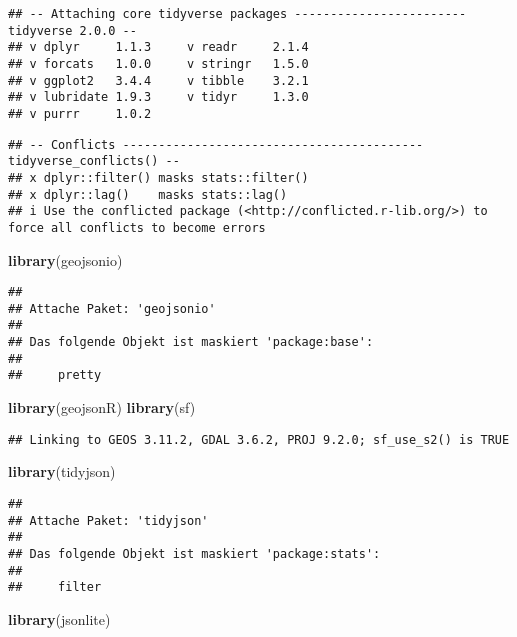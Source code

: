 \documentclass[
]{article}
\newenvironment{Shaded}{\begin{snugshade}}{\end{snugshade}}
\newcommand{\FunctionTok}[1]{\textcolor[rgb]{0.13,0.29,0.53}{\textbf{#1}}}
\newcommand{\NormalTok}[1]{#1}
\begin{document}
\begin{verbatim}
## -- Attaching core tidyverse packages ------------------------ tidyverse 2.0.0 --
## v dplyr     1.1.3     v readr     2.1.4
## v forcats   1.0.0     v stringr   1.5.0
## v ggplot2   3.4.4     v tibble    3.2.1
## v lubridate 1.9.3     v tidyr     1.3.0
## v purrr     1.0.2
\end{verbatim}

\begin{verbatim}
## -- Conflicts ------------------------------------------ tidyverse_conflicts() --
## x dplyr::filter() masks stats::filter()
## x dplyr::lag()    masks stats::lag()
## i Use the conflicted package (<http://conflicted.r-lib.org/>) to force all conflicts to become errors
\end{verbatim}

\begin{Shaded}
\begin{Highlighting}[]
\FunctionTok{library}\NormalTok{(geojsonio)}
\end{Highlighting}
\end{Shaded}

\begin{verbatim}
## 
## Attache Paket: 'geojsonio'
## 
## Das folgende Objekt ist maskiert 'package:base':
## 
##     pretty
\end{verbatim}

\begin{Shaded}
\begin{Highlighting}[]
\FunctionTok{library}\NormalTok{(geojsonR)}
\FunctionTok{library}\NormalTok{(sf)}
\end{Highlighting}
\end{Shaded}

\begin{verbatim}
## Linking to GEOS 3.11.2, GDAL 3.6.2, PROJ 9.2.0; sf_use_s2() is TRUE
\end{verbatim}

\begin{Shaded}
\begin{Highlighting}[]
\FunctionTok{library}\NormalTok{(tidyjson)}
\end{Highlighting}
\end{Shaded}

\begin{verbatim}
## 
## Attache Paket: 'tidyjson'
## 
## Das folgende Objekt ist maskiert 'package:stats':
## 
##     filter
\end{verbatim}

\begin{Shaded}
\begin{Highlighting}[]
\FunctionTok{library}\NormalTok{(jsonlite)}
\end{Highlighting}
\end{Shaded}
\end{document}
